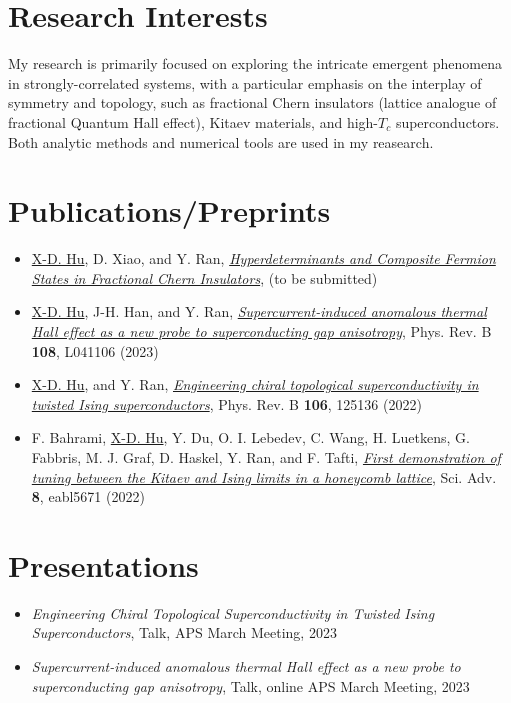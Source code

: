 \documentclass[letterpaper]{article}
\begin{document}
\section*{Research Interests}
My research is primarily focused on exploring the intricate emergent phenomena in strongly-correlated systems, with a particular emphasis on the interplay of symmetry and topology, such as fractional Chern insulators (lattice analogue of fractional Quantum Hall effect), Kitaev materials, and high-$T_c$ superconductors. Both analytic methods and numerical tools are used in my reasearch.

\section*{Publications/Preprints}
\begin{itemize}
    \item \underline{X-D. Hu}, D. Xiao, and Y. Ran, \href{}{\emph{Hyperdeterminants and Composite Fermion States in Fractional Chern Insulators}},  (to be submitted)
    \item \underline{X-D. Hu}, J-H. Han, and Y. Ran, \href{https://journals.aps.org/prb/abstract/10.1103/PhysRevB.108.L041106}{\emph{Supercurrent-induced anomalous thermal Hall effect as a new probe to superconducting gap anisotropy}}, Phys. Rev. B {\bf 108}, L041106 (2023)
    \item \underline{X-D. Hu}, and Y. Ran, \href{https://journals.aps.org/prb/abstract/10.1103/PhysRevB.106.125136}{\emph{Engineering chiral topological superconductivity in twisted Ising superconductors}}, Phys. Rev. B {\bf 106}, 125136 (2022)
    \item F. Bahrami, \underline{X-D. Hu}, Y. Du, O. I. Lebedev, C. Wang, H. Luetkens, G. Fabbris, M. J. Graf, D. Haskel, Y. Ran, and F. Tafti, \href{https://www.science.org/doi/full/10.1126/sciadv.abl5671}{\emph{First demonstration of tuning between the Kitaev and Ising limits in a honeycomb lattice}}, Sci. Adv. {\bf 8}, eabl5671 (2022)
\end{itemize}


\section*{Presentations}
\begin{itemize}
    \item \emph{Engineering Chiral Topological Superconductivity in Twisted Ising Superconductors}, Talk, APS March Meeting, 2023
    \item \emph{Supercurrent-induced anomalous thermal Hall effect as a new probe to superconducting gap anisotropy}, Talk, online APS March Meeting, 2023
\end{itemize}
\end{document}

